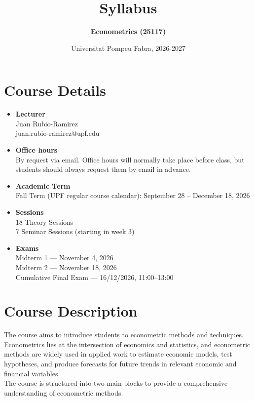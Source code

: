 \documentclass[12pt]{article}
\title{\textbf{Syllabus}}
\author{\textbf{Econometrics (25117)}}
\date{Universitat Pompeu Fabra, 2026-2027}
\begin{document}
\maketitle

\section*{Course Details}
\begin{itemize}
    \item \textbf{Lecturer}\\
    Juan Rubio-Ramirez\\
    juan.rubio-ramirez@upf.edu
    \item \textbf{Office hours}\\
    By request via email. Office hours will normally take place before class, but students should always request them by email in advance.
    \item \textbf{Academic Term}\\
    Fall Term (UPF regular course calendar): September 28 -- December 18, 2026
    \item \textbf{Sessions}\\
    18 Theory Sessions\\
    7 Seminar Sessions (starting in week 3)
    \item \textbf{Exams}\\
    Midterm 1 --- November 4, 2026\\
    Midterm 2 --- November 18, 2026\\
    Cumulative Final Exam --- 16/12/2026, 11:00--13:00
\end{itemize}
\section*{Course Description}
The course aims to introduce students to econometric methods and techniques. Econometrics lies at the intersection of economics and statistics, and econometric methods are widely used in applied work to estimate economic models, test hypotheses, and produce forecasts for future trends in relevant economic and financial variables.\\

The course is structured into two main blocks to provide a comprehensive understanding of econometric methods.
\end{document}
